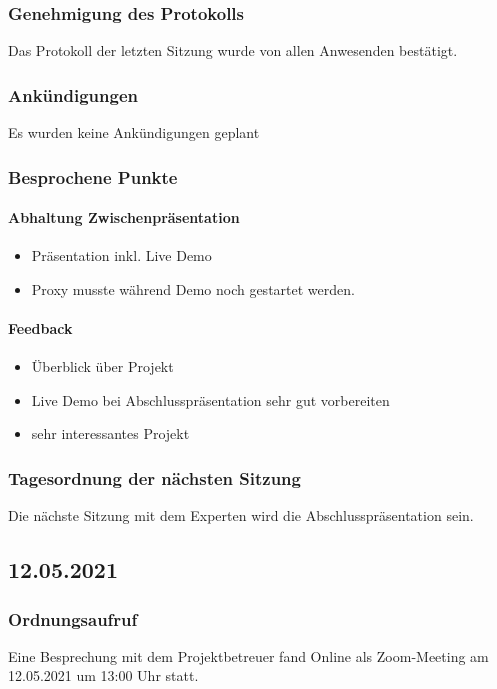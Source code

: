 \subsubsection{Genehmigung des Protokolls}
Das Protokoll der letzten Sitzung wurde von allen Anwesenden bestätigt.
\subsubsection{Ankündigungen}
Es wurden keine Ankündigungen geplant
\subsubsection{Besprochene Punkte}
\paragraph{Abhaltung Zwischenpräsentation}
\begin{itemize}
	\item Präsentation inkl. Live Demo
	\item Proxy musste während Demo noch gestartet werden.
\end{itemize}
\paragraph{Feedback}
\begin{itemize}
	\item Überblick über Projekt
	\item Live Demo bei Abschlusspräsentation sehr gut vorbereiten
	\item sehr interessantes Projekt
\end{itemize}
\subsubsection{Tagesordnung der nächsten Sitzung}
Die nächste Sitzung mit dem Experten wird die Abschlusspräsentation sein. 
\newpage
\subsection{12.05.2021}
\subsubsection{Ordnungsaufruf}
Eine Besprechung mit dem Projektbetreuer fand Online als Zoom-Meeting am 12.05.2021 um 13:00 Uhr statt.
